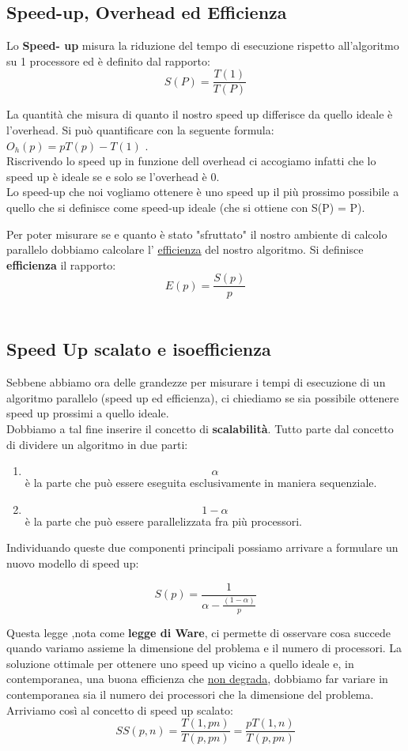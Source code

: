 \documentclass{article}
\begin{document}
\subsection{Speed-up, Overhead ed Efficienza}

Lo \textbf{Speed- up} misura la riduzione del tempo di esecuzione rispetto all'algoritmo su 1 processore ed è definito dal rapporto:
$$ S(P) = \frac{T(1)}{T(P)} $$ 


La quantità che misura di quanto il nostro speed up differisce da quello ideale è l'overhead. Si può quantificare con la seguente formula: $O_h(p) = pT(p) - T(1)$ .\\
Riscrivendo lo speed up in funzione dell overhead ci accogiamo infatti che lo speed up è ideale se e solo se l'overhead è 0.\\


Lo speed-up che noi vogliamo ottenere è uno speed up il più prossimo possibile a quello che si definisce come speed-up ideale (che si ottiene con S(P) = P).

Per poter misurare se e quanto è stato "sfruttato" il nostro ambiente di calcolo parallelo dobbiamo calcolare l' \underline{efficienza} del nostro algoritmo.
Si definisce \textbf{efficienza} il rapporto: $$ E(p) = \frac{S(p)}{p} $$\\

\subsection{Speed Up scalato e isoefficienza}
Sebbene abbiamo ora delle grandezze per misurare i tempi di esecuzione di un algoritmo parallelo (speed up ed efficienza),
ci chiediamo se sia possibile ottenere speed up prossimi a quello ideale.\\
Dobbiamo a tal fine inserire il concetto di \textbf{scalabilità}.
Tutto parte dal concetto di dividere un algoritmo in due parti:
\begin{enumerate}
    \item $$\alpha$$ è la parte che può essere eseguita esclusivamente in maniera sequenziale.
    \item $$1-\alpha$$ è la parte che può essere parallelizzata fra più processori.
\end{enumerate}
Individuando queste due componenti principali possiamo arrivare a formulare un nuovo modello di speed up:

$$S(p)=\frac{1}{\alpha-\frac{(1-\alpha)}{p}}$$

Questa legge ,nota come \textbf{legge di Ware}, ci permette di osservare cosa succede quando variamo assieme la dimensione del problema e il numero di processori.
La soluzione ottimale per ottenere uno speed up vicino a quello ideale e, in contemporanea, una buona efficienza che \underline{non degrada}, dobbiamo far variare in contemporanea sia il numero dei processori che la dimensione del problema.
Arriviamo così al concetto di speed up scalato:
$$SS(p,n)=\frac{T(1,pn)}{T(p,pn)}=\frac{pT(1,n)}{T(p,pn)}$$
\end{document}

